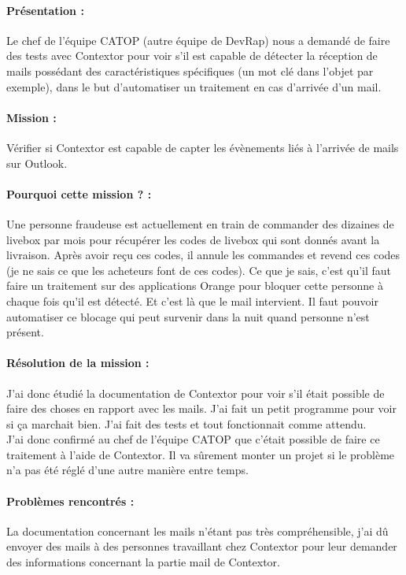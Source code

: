 \documentclass[a4paper,twoside,12pt]{report}
\begin{document}
\paragraph {Présentation :} 
Le chef de l'équipe CATOP (autre équipe de DevRap) nous a demandé de faire des tests avec Contextor pour voir s'il est capable de détecter la réception de mails possédant des caractéristiques spécifiques (un mot clé dans l'objet par exemple), dans le but d'automatiser un traitement en cas d'arrivée d'un mail.
\paragraph {Mission :}
Vérifier si Contextor est capable de capter les évènements liés à l'arrivée de mails sur Outlook.
\paragraph {Pourquoi cette mission ? :}
Une personne fraudeuse est actuellement en train de commander des dizaines de livebox par mois pour récupérer les codes de livebox qui sont donnés avant la livraison. Après avoir reçu ces codes, il annule les commandes et revend ces codes (je ne sais ce que les acheteurs font de ces codes). Ce que je sais, c'est qu'il faut faire un traitement sur des applications Orange pour bloquer cette personne à chaque fois qu'il est détecté. Et c'est là que le mail intervient. Il faut pouvoir automatiser ce blocage qui peut survenir dans la nuit quand personne n'est présent. 
\paragraph {Résolution de la mission :}
J'ai donc étudié la documentation de Contextor pour voir s'il était possible de faire des choses en rapport avec les mails. J'ai fait un petit programme pour voir si ça marchait bien. J'ai fait des tests et tout fonctionnait comme attendu.\\
J'ai donc confirmé au chef de l'équipe CATOP que c'était possible de faire ce traitement à l'aide de Contextor. Il va sûrement monter un projet si le problème n'a pas été réglé d'une autre manière entre temps.
\paragraph {Problèmes rencontrés :}
La documentation concernant les mails n'étant pas très compréhensible, j'ai dû envoyer des mails à des personnes travaillant chez Contextor pour leur demander des informations concernant la partie mail de Contextor.
\newpage
\end{document}

